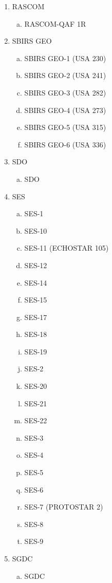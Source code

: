 \begin{multicols}{2}
\begin{enumerate}
  \item RASCOM
  \begin{enumerate}[a.]
    \item RASCOM-QAF 1R
  \end{enumerate}
  \item SBIRS GEO
  \begin{enumerate}[a.]
    \item SBIRS GEO-1 (USA 230)
    \item SBIRS GEO-2 (USA 241)
    \item SBIRS GEO-3 (USA 282)
    \item SBIRS GEO-4 (USA 273)
    \item SBIRS GEO-5 (USA 315)
    \item SBIRS GEO-6 (USA 336)
  \end{enumerate}
  \item SDO
  \begin{enumerate}[a.]
    \item SDO
  \end{enumerate}
  \item SES
  \begin{enumerate}[a.]
    \item SES-1
    \item SES-10
    \item SES-11 (ECHOSTAR 105)
    \item SES-12
    \item SES-14
    \item SES-15
    \item SES-17
    \item SES-18
    \item SES-19
    \item SES-2
    \item SES-20
    \item SES-21
    \item SES-22
    \item SES-3
    \item SES-4
    \item SES-5
    \item SES-6
    \item SES-7 (PROTOSTAR 2)
    \item SES-8
    \item SES-9
  \end{enumerate}
  \item SGDC
  \begin{enumerate}[a.]
    \item SGDC
  \end{enumerate}

\end{enumerate}
\end{multicols}
